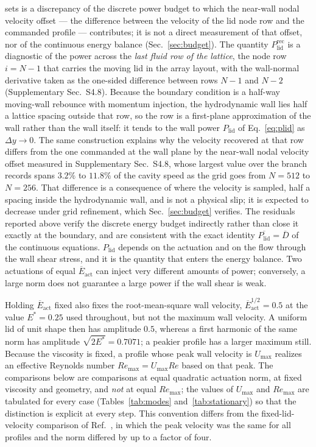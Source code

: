 \documentclass[11pt,a4paper]{article}
\newcommand{\Dbar}{\overline{D}}
\newcommand{\Plid}{P_{\mathrm{lid}}}
\newenvironment{chgadd}{\par\color{blue}}{\par\color{black}}
\begin{document}
\begin{chgadd}
sets is a discrepancy of the discrete power budget to which the near-wall nodal
velocity offset --- the difference between the velocity of the lid node row and the
commanded profile --- contributes; it is not a
direct measurement of that offset, nor of the continuous energy balance
(Sec.~\ref{sec:budget}). The quantity $\Plid^{\mathrm{rec}}$ is a diagnostic
of the power across the \emph{last fluid row of the lattice}, the node row
$i=N-1$ that carries the moving lid in the array layout, with the wall-normal
derivative taken as the one-sided difference between rows $N-1$ and $N-2$
(Supplementary Sec.~S4.8). Because the boundary condition is a half-way
moving-wall rebounce with momentum injection, the hydrodynamic wall lies half a lattice
spacing outside that row, so the row is a first-plane approximation of the wall
rather than the wall itself: it tends to the wall power $\Plid$ of
Eq.~\eqref{eq:plid} as $\Delta y\to0$. The same construction explains why the velocity
recovered at that row differs from the one commanded at the wall plane by the
near-wall nodal velocity offset measured in Supplementary Sec.~S4.8, whose largest
value over the branch records spans $3.2\%$ to $11.8\%$ of the cavity speed as the
grid goes from \(N=512\) to \(N=256\). That difference is a
consequence of where the velocity is sampled, half a spacing inside the
hydrodynamic wall, and is not a physical slip; it is expected to decrease under grid
refinement, which Sec.~\ref{sec:budget} verifies. The
residuals reported above verify the discrete energy budget indirectly
rather than close it exactly at the boundary, and are
consistent with the exact identity $\overline{\Plid}=\Dbar$ of the continuous
equations. $\Plid$ depends on the actuation
and on the flow through the wall shear stress, and it is the quantity that enters
the energy balance. Two actuations of equal $\overline{E}_{\mathrm{act}}$ can
inject very different amounts of power; conversely, a large norm does
not guarantee a large power if the wall shear is weak.

Holding $\overline{E}_{\mathrm{act}}$ fixed also fixes the root-mean-square wall
velocity, $\overline{E}_{\mathrm{act}}^{1/2}=0.5$ at the value $E^\ast=0.25$ used
throughout, but not the maximum wall velocity. A uniform lid of unit shape then
has amplitude $0.5$, whereas a first harmonic of the same norm has amplitude
$\sqrt{2E^\ast}=0.7071$; a peakier profile has a larger maximum still. Because
the viscosity is fixed, a profile whose peak wall velocity is $U_{\max}$ realizes
an effective Reynolds number $Re_{\max}=U_{\max}Re$ based on that peak. The
comparisons below are comparisons at equal quadratic actuation norm, at
fixed viscosity and geometry, and \emph{not} at equal $Re_{\max}$; the values of
$U_{\max}$ and $Re_{\max}$ are tabulated for every case
(Tables~\ref{tab:modes} and~\ref{tab:stationary}) so that the distinction is
explicit at every step. This convention differs from the fixed-lid-velocity
comparison of Ref.~\cite{beniaiche2026}, in which the peak velocity was the same
for all profiles and the norm differed by up to a factor of four.


\end{chgadd}
\end{document}
